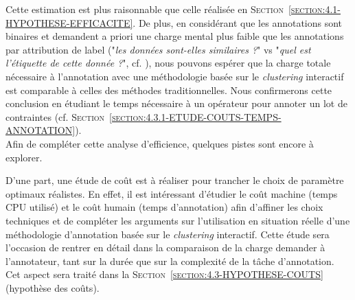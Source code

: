 			Cette estimation est plus raisonnable que celle réalisée en \textsc{Section~\ref{section:4.1-HYPOTHESE-EFFICACITE}}.
			De plus, en considérant que les annotations sont binaires et demandent a priori une charge mental plus faible que les annotations par attribution de label ("\textit{les données sont-elles similaires ?}" vs "\textit{quel est l'étiquette de cette donnée ?}", cf. \cite{hart-staveland:1988:development-nasatlx-task}), nous pouvons espérer que la charge totale nécessaire à l'annotation avec une méthodologie basée sur le \textit{clustering} interactif est comparable à celles des méthodes traditionnelles.
			Nous confirmerons cette conclusion en étudiant le temps nécessaire à un opérateur pour annoter un lot de contraintes (cf. \textsc{Section~\ref{section:4.3.1-ETUDE-COUTS-TEMPS-ANNOTATION}}).
			\\
			
			Afin de compléter cette analyse d'efficience, quelques pistes sont encore à explorer.
			
			D'une part, une étude de coût est à réaliser pour trancher le choix de paramètre optimaux réalistes.
			En effet, il est intéressant d'étudier le coût machine (temps CPU utilisé) et le coût humain (temps d'annotation) afin d'affiner les choix techniques et de compléter les arguments sur l'utilisation en situation réelle d'une méthodologie d'annotation basée sur le \textit{clustering} interactif.
			Cette étude sera l'occasion de rentrer en détail dans la comparaison de la charge demander à l'annotateur, tant sur la durée que sur la complexité de la tâche d'annotation.
			Cet aspect sera traité dans la \textsc{Section~\ref{section:4.3-HYPOTHESE-COUTS}} (hypothèse des coûts).
			
